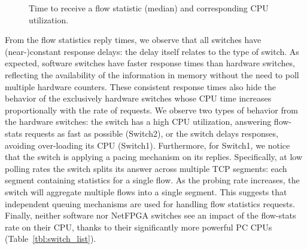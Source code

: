 \begin{figure}[h]
  \begin{center}
  \end{center}
  \caption{Time to receive a flow statistic (median) and corresponding CPU utilization.}
  \label{fig:stat_request}
\end{figure}

From the flow statistics reply times, we observe that all switches have (near-)constant 
response delays: the delay itself relates to the type of switch.
As expected, software switches have faster response times than
hardware switches, reflecting the availability of the information in memory
without the need to poll multiple hardware counters. These consistent response
times also hide the behavior of the exclusively hardware switches
whose CPU time increases proportionally with the rate of requests.  We
observe two types of behavior from the hardware switches: the switch
has a high CPU utilization, answering flow-stats requests as fast as
possible (Switch2), or the switch delays responses, avoiding
over-loading its CPU (Switch1). Furthermore, for Switch1,
we notice that the switch is applying a pacing mechanism on its
replies. Specifically, at low polling rates the switch splits its
answer across multiple TCP segments: each segment containing statistics for a
single flow.  As the probing rate increases, the switch
will aggregate multiple flows into a single segment. This suggests that 
independent queuing mechanisms are used for handling flow statistics 
requests. Finally, neither software nor NetFPGA switches see an 
impact of the flow-stats rate on their CPU, thanks to their significantly 
more powerful PC CPUs (Table~\ref{tbl:switch_list}).

